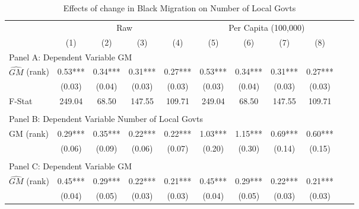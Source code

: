  \begin{table}[htbp]\centering {} \begin{threeparttable} \caption{Effects of change in Black Migration on Number of Local Govts} \begin{tabular}{l*{10}{c}} \toprule
                &\multicolumn{4}{c}{Raw}                                    &\multicolumn{4}{c}{Per Capita (100,000)}                   \\\cmidrule(lr){2-5}\cmidrule(lr){6-9}
                &\multicolumn{1}{c}{(1)}   &\multicolumn{1}{c}{(2)}   &\multicolumn{1}{c}{(3)}   &\multicolumn{1}{c}{(4)}   &\multicolumn{1}{c}{(5)}   &\multicolumn{1}{c}{(6)}   &\multicolumn{1}{c}{(7)}   &\multicolumn{1}{c}{(8)}   \\
\cmidrule(lr){1-9}
\multicolumn{8}{l}{Panel A: Dependent Variable GM}\\
\cmidrule(lr){1-9}
$\hat{GM}$ (rank)&       0.53***&       0.34***&       0.31***&       0.27***&       0.53***&       0.34***&       0.31***&       0.27***\\
                &     (0.03)   &     (0.04)   &     (0.03)   &     (0.03)   &     (0.03)   &     (0.04)   &     (0.03)   &     (0.03)   \\
\midrule
F-Stat          &     249.04   &      68.50   &     147.55   &     109.71   &     249.04   &      68.50   &     147.55   &     109.71   \\
\cmidrule[\heavyrulewidth](lr){1-9} \\ \cmidrule[\heavyrulewidth](lr){1-9}
\multicolumn{8}{l}{Panel B: Dependent Variable Number of Local Govts}\\
\cmidrule(lr){1-9}
GM  (rank)      &       0.29***&       0.35***&       0.22***&       0.22***&       1.03***&       1.15***&       0.69***&       0.60***\\
                &     (0.06)   &     (0.09)   &     (0.06)   &     (0.07)   &     (0.20)   &     (0.30)   &     (0.14)   &     (0.15)   \\
\cmidrule[\heavyrulewidth](lr){1-9} \\ \cmidrule[\heavyrulewidth](lr){1-9}
\multicolumn{8}{l}{Panel C: Dependent Variable GM}\\
\cmidrule(lr){1-9}
$\hat{GM}$ (rank)&       0.45***&       0.29***&       0.22***&       0.21***&       0.45***&       0.29***&       0.22***&       0.21***\\
                &     (0.04)   &     (0.05)   &     (0.03)   &     (0.03)   &     (0.04)   &     (0.05)   &     (0.03)   &     (0.03)   \\

\end{tabular}
\end{threeparttable}
\end{table}

